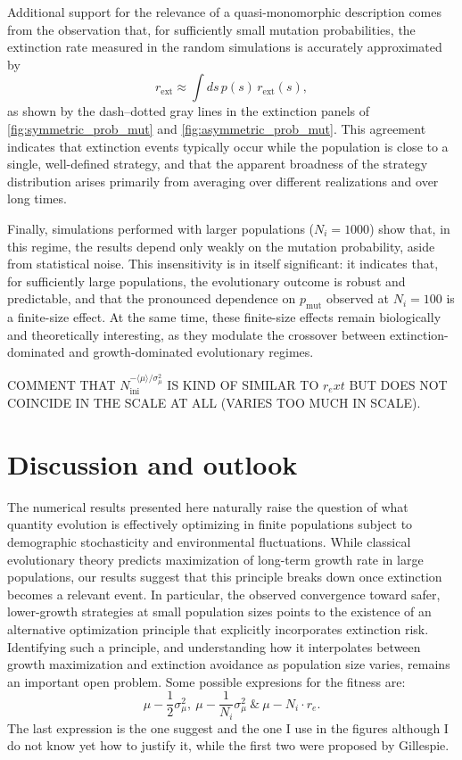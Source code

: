 \documentclass[a4paper,10pt,twocolumn]{article}
\begin{document}
Additional support for the relevance of a quasi-monomorphic description comes from the observation that, for sufficiently small mutation probabilities, the extinction rate measured in the random simulations is accurately approximated by
\begin{equation}
    r_{\text{ext}} \approx \int ds\, p(s)\, r_{\text{ext}}(s),
\end{equation}
as shown by the dash--dotted gray lines in the extinction panels of \autoref{fig:symmetric_prob_mut} and \autoref{fig:asymmetric_prob_mut}. This agreement indicates that extinction events typically occur while the population is close to a single, well-defined strategy, and that the apparent broadness of the strategy distribution arises primarily from averaging over different realizations and over long times.

Finally, simulations performed with larger populations ($N_i=1000$) show that, in this regime, the results depend only weakly on the mutation probability, aside from statistical noise. This insensitivity is in itself significant: it indicates that, for sufficiently large populations, the evolutionary outcome is robust and predictable, and that the pronounced dependence on $p_{\mathrm{mut}}$ observed at $N_i=100$ is a finite-size effect. At the same time, these finite-size effects remain biologically and theoretically interesting, as they modulate the crossover between extinction-dominated and growth-dominated evolutionary regimes.

COMMENT THAT $N_{\text{ini}}^{-\langle\mu\rangle/\sigma_\mu^2}$ IS KIND OF SIMILAR TO $r_ext$ BUT DOES NOT COINCIDE IN THE SCALE AT ALL (VARIES TOO MUCH IN SCALE).

\section{Discussion and outlook} \label{sec:discussion}

The numerical results presented here naturally raise the question of what quantity evolution is effectively optimizing in finite populations subject to demographic stochasticity and environmental fluctuations. While classical evolutionary theory predicts maximization of long-term growth rate in large populations, our results suggest that this principle breaks down once extinction becomes a relevant event. In particular, the observed convergence toward safer, lower-growth strategies at small population sizes points to the existence of an alternative optimization principle that explicitly incorporates extinction risk. Identifying such a principle, and understanding how it interpolates between growth maximization and extinction avoidance as population size varies, remains an important open problem. Some possible expresions for the fitness are:
\begin{equation} \label{eq:effective_fitness}
    \mu-\frac{1}{2}\sigma_\mu^2, \ \mu-\frac{1}{N_i}\sigma_\mu^2 \ \& \ \mu-N_i\cdot r_e.
\end{equation}
The last expression is the one suggest and the one I use in the figures although I do not know yet how to justify it, while the first two were proposed by Gillespie.
\end{document}
